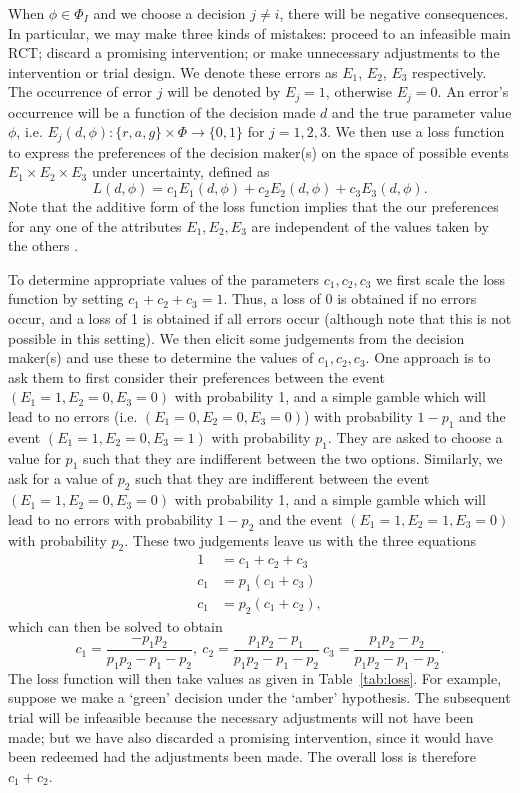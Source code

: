\documentclass[AMA,STIX1COL]{WileyNJD-v2}
\begin{document}
When $\phi \in \Phi_{I}$ and we choose a decision $j \neq i$, there will be negative consequences. In particular, we may make three kinds of mistakes: proceed to an infeasible main RCT; discard a promising intervention; or make unnecessary adjustments to the intervention or trial design. We denote these errors as $E_1$, $E_2$, $E_3$ respectively. The occurrence of error $j$ will be denoted by $E_j = 1$, otherwise $E_j = 0$. An error's occurrence will be a function of the decision made $d$ and the true parameter value $\phi$, i.e. $E_j(d, \phi): \{r, a, g\} \times \Phi \rightarrow \{0,1\}$ for $j = 1,2,3$. We then use a loss function to express the preferences of the decision maker(s) on the space of possible events $E_1 \times E_2 \times E_3$ under uncertainty, defined as
$$
L(d, \phi) = c_1 E_1(d, \phi) + c_2 E_2(d, \phi) + c_3 E_3(d, \phi).
$$
Note that the additive form of the loss function implies that the our preferences for any one of the attributes $E_1, E_2, E_3$ are independent of the values taken by the others \cite{French2000}. 

To determine appropriate values of the parameters $c_1, c_2, c_3$ we first scale the loss function by setting $c_1 + c_2 + c_3 = 1$. Thus, a loss of 0 is obtained if no errors occur, and a loss of 1 is obtained if all errors occur (although note that this is not possible in this setting). We then elicit some judgements from the decision maker(s) and use these to determine the values of $c_1, c_2, c_3$. One approach is to ask them to first consider their preferences between the event $(E_1 = 1, E_2 = 0, E_3 = 0)$ with probability 1, and a simple gamble which will lead to no errors (i.e. $(E_1 = 0, E_2 = 0, E_3 = 0)$) with probability $1 - p_1$ and the event $(E_1 = 1, E_2 = 0, E_3 = 1)$ with probability $p_1$. They are asked to choose a value for $p_1$ such that they are indifferent between the two options. Similarly, we ask for a value of $p_2$ such that they are indifferent between the event $(E_1 = 1, E_2 = 0, E_3 = 0)$ with probability 1, and a simple gamble which will lead to no errors with probability $1 - p_2$ and the event $(E_1 = 1, E_2 = 1, E_3 = 0)$ with probability $p_2$. These two judgements leave us with the three equations
\begin{align*}
1 & = c_1 + c_2 + c_3  \\
c_1 & = p_1 (c_1 + c_3) \\
c_1 & = p_2 (c_1 + c_2),
\end{align*}
which can then be solved to obtain
\begin{equation*}
c_1 = \frac{-p_1 p_2}{p_1 p_2 - p_1 - p_2}, ~ c_2 = \frac{p_1 p_2 - p_1}{p_1 p_2 - p_1 - p_2} ~ c_3 = \frac{p_1 p_2 - p_2}{p_1 p_2 - p_1 - p_2}.
\end{equation*}
The loss function will then take values as given in Table~\ref{tab:loss}. For example, suppose we make a `green' decision under the `amber' hypothesis. The subsequent trial will be infeasible because the necessary adjustments will not have been made; but we have also discarded a promising intervention, since it would have been redeemed had the adjustments been made. The overall loss is therefore $c_{1} + c_{2}$.
\end{document}
